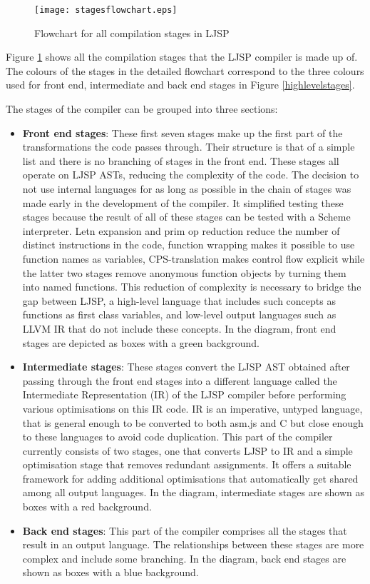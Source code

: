 \documentclass[11pt]{report}
\begin{document}
\begin{figure}[ht]
\begin{center}
\texttt{[image: stagesflowchart.eps]}
\end{center}
\caption{Flowchart for all compilation stages in LJSP}
\label{stagesflowchart}
\end{figure}

Figure \ref{stagesflowchart} shows all the compilation stages that the LJSP compiler is made up of. The colours of the stages in the detailed flowchart correspond to the three colours used for front end, intermediate and back end stages in Figure \ref{highlevelstages}. 

The stages of the compiler can be grouped into three sections:
\begin{itemize}
\item \textbf{Front end stages}: These first seven stages make up the first part of the transformations the code passes through. Their structure is that of a simple list and there is no branching of stages in the front end. These stages all operate on LJSP ASTs, reducing the complexity of the code. The decision to not use internal languages for as long as possible in the chain of stages was made early in the development of the compiler. It simplified testing these stages because the result of all of these stages can be tested with a Scheme interpreter. Letn expansion and prim op reduction reduce the number of distinct instructions in the code, function wrapping makes it possible to use function names as variables, CPS-translation makes control flow explicit while the latter two stages remove anonymous function objects by turning them into named functions. This reduction of complexity is necessary to bridge the gap between LJSP, a high-level language that includes such concepts as functions as first class variables, and low-level output languages such as LLVM IR that do not include these concepts. In the diagram, front end stages are depicted as boxes with a green background.

\item \textbf{Intermediate stages}: These stages convert the LJSP AST obtained after passing through the front end stages into a different language called the Intermediate Representation (IR) of the LJSP compiler before performing various optimisations on this IR code. IR is an imperative, untyped language, that is general enough to be converted to both asm.js and C but close enough to these languages to avoid code duplication. This part of the compiler currently consists of two stages, one that converts LJSP to IR and a simple optimisation stage that removes redundant assignments. It offers a suitable framework for adding additional optimisations that automatically get shared among all output languages. In the diagram, intermediate stages are shown as boxes with a red background.

\item \textbf{Back end stages}: This part of the compiler comprises all the stages that result in an output language. The relationships between these stages are more complex and include some branching. In the diagram, back end stages are shown as boxes with a blue background.
\end{itemize}
\end{document}
